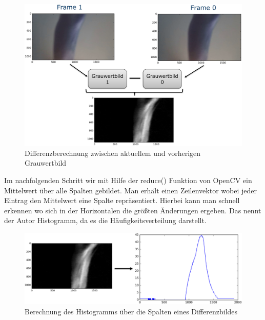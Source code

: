 \begin{figure}[ht!]
\centering
\includegraphics[angle=0,width=14cm]{handcontrol/Bilder/diff_frame1-frame0.png}
\caption{Differenzberechnung zwischen aktuellem und vorherigen Grauwertbild}
\end{figure}

Im nachfolgenden Schritt wir mit Hilfe der reduce() Funktion von OpenCV ein Mittelwert über alle Spalten gebildet. Man erhält einen Zeilenvektor wobei jeder Eintrag den Mittelwert eine Spalte repräsentiert. Hierbei kann man schnell erkennen wo sich in der Horizontalen die größten Änderungen ergeben. Das nennt der Autor Histogramm, da es die Häufigkeitsverteilung darstellt.

\begin{figure}[ht!]
\centering
\includegraphics[angle=0,width=14cm]{handcontrol/Bilder/diff_frame_to_hist.png}
\caption{Berechnung des Histogramms über die Spalten eines Differenzbildes}
\end{figure}

